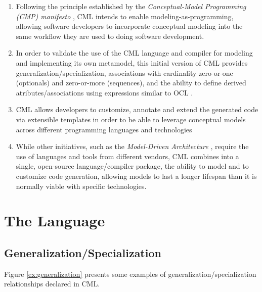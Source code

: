 \documentclass[a0,portrait]{a0poster}
\makeatletter
\newcommand{\verbatimfont}[1]{\renewcommand{\verbatim@font}{\ttfamily#1}}
\makeatother
\begin{document}
\begin{multicols}{3}
\begin{enumerate}
\item Following the principle established by
the \emph{Conceptual-Model Programming (CMP) manifesto} \cite{cmp},
CML intends to enable modeling-as-programming,
allowing software developers to incorporate conceptual modeling
into the same workflow they are used to doing software development.

\item In order to validate the use of the CML language and compiler
for modeling and implementing its own metamodel,
this initial version of CML provides
generalization/specialization,
associations with cardinality zero-or-one (optionals)
and zero-or-more (sequences),
and the ability to define derived atributes/associations
using expressions similar to OCL \cite{ocl}.

\item CML allows developers to customize, annotate and extend
the generated code via extensible templates
in order to be able to leverage conceptual models
across different programming languages and technologies

\item While other initiatives,
such as the \emph{Model-Driven Architecture} \cite{mda},
require the use of languages and tools from different vendors,
CML combines into a single, open-source language/compiler package,
the ability to model and to customize code generation,
allowing models to last a longer lifespan
than it is normally viable with specific technologies.

\end{enumerate}


\section*{The Language}

\subsection*{Generalization/Specialization}

Figure \ref{ex:generalization} presents some examples of
generalization/specialization relationships declared in CML.

\begin{center}
\verbatimfont{\small}

\label{ex:generalization}
\end{center}


\end{multicols}
\end{document}
